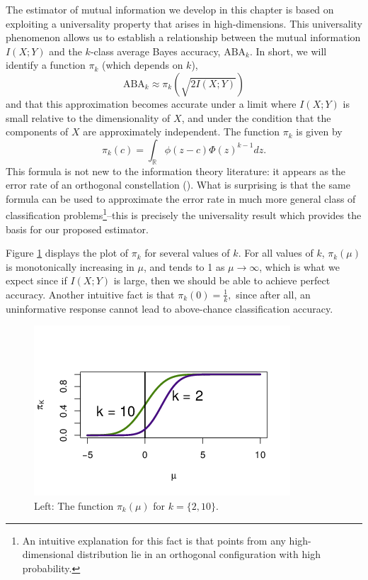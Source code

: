 The estimator of mutual information we develop in this chapter is
based on exploiting a universality property that arises in
high-dimensions.  This universality phenomenon allows us to establish
a relationship between the mutual information $I(X; Y)$ and the
$k$-class average Bayes accuracy, $\text{ABA}_k$.  In short, we will
identify a function $\pi_k$ (which depends on $k$),
\begin{equation}\label{abepi}
\text{ABA}_k \approx \pi_k(\sqrt{2 I(X; Y)})
\end{equation}
and that this approximation becomes accurate under a limit where $I(X;
Y)$ is small relative to the dimensionality of $X$, and under the
condition that the components of $X$ are approximately independent.
The function $\pi_k$ is given by
\[
\pi_k(c) = \int_{\mathbb{R}} \phi(z - c)  \Phi(z)^{k-1} dz.
\]
This formula is not new to the information theory literature: it
appears as the error rate of an orthogonal constellation (\cite{cioffi2014}).  What
is surprising is that the same formula can be used to approximate the
error rate in much more general class of classification
problems\footnote{An intuitive explanation for this fact is that
  points from any high-dimensional distribution lie in an orthogonal
  configuration with high probability.}--this is precisely the
universality result which provides the basis for our proposed
estimator.

Figure \ref{fig:pi} displays the plot of $\pi_k$ for several values of
$k$.  For all values of $k$, $\pi_k(\mu)$ is monotonically increasing
in $\mu$, and tends to 1 as $\mu \to \infty$, which is what we expect
since if $I(X; Y)$ is large, then we should be able to achieve perfect
accuracy.  Another intuitive fact is that $ \pi_k(0) = \frac{1}{k}, $
since after all, an uninformative response cannot lead to above-chance
classification accuracy.


\begin{figure}
\centering
\includegraphics[scale = 0.7, clip=true, trim=0 0.2in 0 0.5in]{Figures/illus_piK_flat_flipped.png}
\caption{Left: The function $\pi_k(\mu)$ for $k = \{2, 10\}$.}
\label{fig:pi}
\end{figure}

